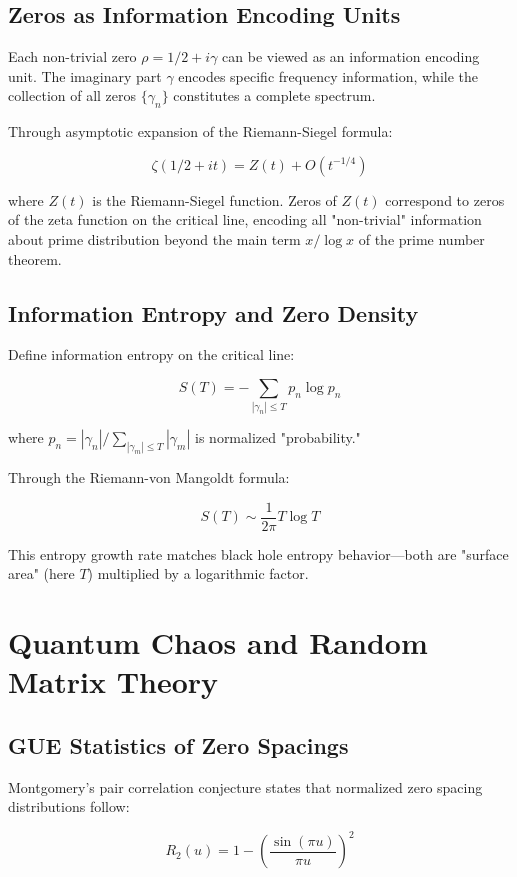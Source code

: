 \documentclass[12pt]{article}
\begin{document}
\subsection{Zeros as Information Encoding Units}

Each non-trivial zero $\rho = 1/2 + i\gamma$ can be viewed as an information encoding unit. The imaginary part $\gamma$ encodes specific frequency information, while the collection of all zeros $\{\gamma_n\}$ constitutes a complete spectrum.

Through asymptotic expansion of the Riemann-Siegel formula:

$$\zeta(1/2 + it) = Z(t) + O(t^{-1/4})$$

where $Z(t)$ is the Riemann-Siegel function. Zeros of $Z(t)$ correspond to zeros of the zeta function on the critical line, encoding all "non-trivial" information about prime distribution beyond the main term $x/\log x$ of the prime number theorem.

\subsection{Information Entropy and Zero Density}

Define information entropy on the critical line:

$$S(T) = -\sum_{|\gamma_n| \leq T} p_n \log p_n$$

where $p_n = |\gamma_n|/\sum_{|\gamma_m| \leq T} |\gamma_m|$ is normalized "probability."

Through the Riemann-von Mangoldt formula:

$$S(T) \sim \frac{1}{2\pi} T\log T$$

This entropy growth rate matches black hole entropy behavior—both are "surface area" (here $T$) multiplied by a logarithmic factor.

\section{Quantum Chaos and Random Matrix Theory}

\subsection{GUE Statistics of Zero Spacings}

Montgomery's pair correlation conjecture states that normalized zero spacing distributions follow:

$$R_2(u) = 1 - \left(\frac{\sin(\pi u)}{\pi u}\right)^2$$
\end{document}

